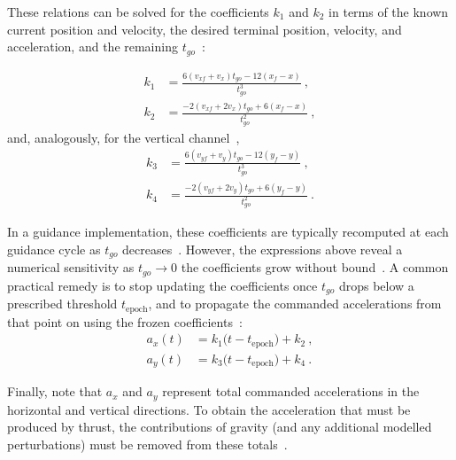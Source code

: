 These relations can be solved for the coefficients $k_1$ and $k_2$ in terms of the known current position and velocity, the desired terminal position, velocity, and acceleration, and the remaining $t_{go}$~\cite{Mooij_lunar_ascent}:

\begin{equation}
\begin{aligned}
k_1 &= \frac{6\left(v_{xf}+v_x\right)t_{go}-12\left(x_f-x\right)}{t_{go}^3} \ ,\\[4pt]
k_2 &= \frac{-2\left(v_{xf}+2v_x\right)t_{go}+6\left(x_f-x\right)}{t_{go}^2} \ ,
\end{aligned}
\end{equation}
and, analogously, for the vertical channel~\cite{Mooij_lunar_ascent},
\begin{equation}
\begin{aligned}
k_3 &= \frac{6\left(v_{yf}+v_y\right)t_{go}-12\left(y_f-y\right)}{t_{go}^3} \ ,\\[4pt]
k_4 &= \frac{-2\left(v_{yf}+2v_y\right)t_{go}+6\left(y_f-y\right)}{t_{go}^2} \ .
\end{aligned}
\end{equation}

In a guidance implementation, these coefficients are typically recomputed at each guidance cycle as
$t_{go}$ decreases~\cite{Mooij_lunar_ascent}. However, the expressions above reveal a numerical sensitivity as $t_{go}\to 0$ the
coefficients grow without bound~\cite{Mooij_lunar_ascent}. A common practical remedy is to stop updating the coefficients once
$t_{go}$ drops below a prescribed threshold $t_{\mathrm{epoch}}$, and to propagate the commanded
accelerations from that point on using the frozen coefficients~\cite{wong2006hazard_avoidance_mars, sostaric2005powered}:
\begin{equation}
\begin{aligned}
a_x(t) &= k_1\bigl(t-t_{\mathrm{epoch}}\bigr)+k_2 \ ,\\
a_y(t) &= k_3\bigl(t-t_{\mathrm{epoch}}\bigr)+k_4 \ .
\end{aligned}
\end{equation}

Finally, note that $a_x$ and $a_y$ represent total commanded accelerations in the horizontal and
vertical directions. To obtain the acceleration that must be produced by thrust, the contributions of
gravity (and any additional modelled perturbations) must be removed from these totals~\cite{Mooij_lunar_ascent}.

